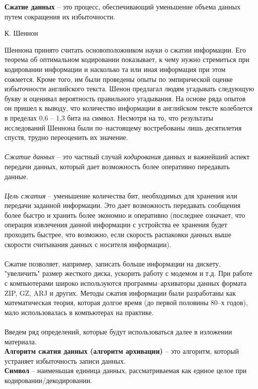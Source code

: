 \textbf{Сжатие данных} -- это процесс, обеспечивающий уменьшение объема данных путем сокращения их избыточности.
\begin{flushright}
  К. Шеннон
\end{flushright}
 Шеннона принято считать основоположником науки о сжатии информации. Его теорема об оптимальном кодировании показывает, к чему нужно стремиться при кодировании информации и насколько та или иная информация при этом сожмется. Кроме того, им были проведены опыты по эмпирической оценке избыточности английского текста. Шенон предлагал людям угадывать следующую букву и оценивал вероятность правильного угадывания. На основе ряда опытов он пришел к выводу, что количество информации в английском тексте колеблется в пределах 0,6 – 1,3 бита на символ. Несмотря на то, что результаты исследований Шеннона были по--настоящему востребованы лишь десятилетия спустя, трудно переоценить их значение.\\
\\\emph{Сжатие данных} -- это частный случай \emph{кодирования} данных и важнейший аспект передачи данных, который дает возможность более оперативно передавать данные. 
\\\\\emph{Цель сжатия} -- уменьшение количества бит, необходимых для хранения или передачи заданной информации. Это дает возможность передавать сообщения более быстро и хранить более экономно и оперативно (последнее означает, что операция извлечения данной информации с устройства ее хранения будет проходить быстрее, что возможно, если скорость распаковки данных выше скорости считывания данных с носителя информации).\\
\\Сжатие позволяет, например, записать больше информации на дискету, "увеличить" размер жесткого диска, ускорить работу с модемом и т.д. При работе с компьютерами широко используются программы--архиваторы данных формата ZIP, GZ, ARJ и других. Методы сжатия информации были разработаны как математическая теория, которая долгое время (до первой половины 80--х годов), мало использовалась в компьютерах на практике.\\
\\Введем ряд определений, которые будут использоваться далее в изложении материала.
\\\textbf{Алгоритм сжатия данных (алгоритм архивации)} -- это алгоритм, который устраняет избыточность записи данных.
\\\textbf{Символ} -- наименьшая единица данных, рассматриваемая как единое целое при кодировании/декодировании.
